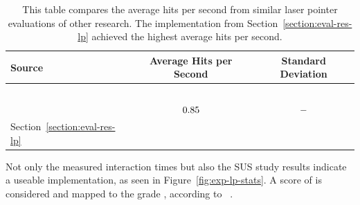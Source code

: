 \begin{table}[H]
	\centering
	\begin{tabular}{l c c}
		\toprule
		Source                                            & Average Hits per Second                                                            & Standard Deviation                                                                \\
		\midrule
		\citeauthor{Kamm.2018}~\cite{Kamm.2018}           & \pgfmathparse{\kammAvgHits}\pgfmathprintnumber[fixed, precision=2]{\pgfmathresult} & \pgfmathparse{\kammAvgStd}\pgfmathprintnumber[fixed, precision=2]{\pgfmathresult} \\%
		\citeauthor{JiYoungOh.2002}~\cite{JiYoungOh.2002} & $0.85{}$                                                                  & $-{}$                                                                  \\%
		Section~\ref{section:eval-res-lp}                 & \pgfmathparse{\oursAvgHits}\pgfmathprintnumber[fixed, precision=2]{\pgfmathresult} & \pgfmathparse{\oursAvgStd}\pgfmathprintnumber[fixed, precision=2]{\pgfmathresult} \\
		\bottomrule
	\end{tabular}
	\caption[Comparison of laser pointer task results]{This table compares the average hits per second from similar laser pointer evaluations of other research. The implementation from Section~\ref{section:eval-res-lp} achieved the highest average hits per second.}\label{tab:lp-comp}
\end{table}

Not only the measured interaction times but also the \gls{SUS} study results indicate a useable implementation, as seen in Figure~\ref{fig:exp-lp-stats}. A score of \evalExpLpSusScore{} is considered \evalExpLpSusAdj{} and mapped to the grade \evalExpLpSusGrade{}, according to \citeauthor{Bangor.2009}~\cite[120\psq]{Bangor.2009}.

